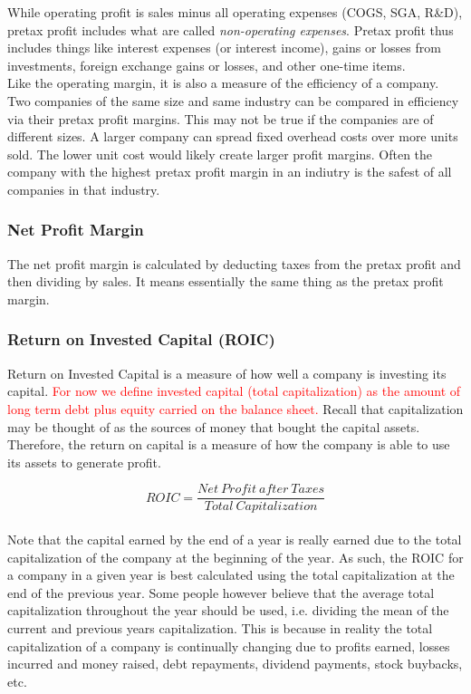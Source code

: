 \documentclass{article}
\begin{document}
While operating profit is sales minus all operating expenses (COGS, SGA, R\&D), pretax profit includes what are called \textit{non-operating expenses}. Pretax profit thus includes things like interest expenses (or interest income), gains or losses from investments, foreign exchange gains or losses, and other one-time items. \\

Like the operating margin, it is also a measure of the efficiency of a company. Two companies of the same size and same industry can be compared in efficiency via their pretax profit margins. This may not be true if the companies are of different sizes. A larger company can spread fixed overhead costs over more units sold. The lower unit cost would likely create larger profit margins. Often the company with the highest pretax profit margin in an indiutry is the safest of all companies in that industry. 

\subsubsection{Net Profit Margin}
The net profit margin is calculated by deducting taxes from the pretax profit and then dividing by sales. It means essentially the same thing as the pretax profit margin. 

\subsubsection{Return on Invested Capital (ROIC)}
Return on Invested Capital is a measure of how well a company is investing its capital. \textcolor{red}{For now we define invested capital (total capitalization) as the amount of long term debt plus equity carried on the balance sheet.} Recall that capitalization may be thought of as the sources of money that bought the capital assets. Therefore, the return on capital is a measure of how the company is able to use its assets to generate profit. 

 \begin{equation}
    ROIC = \frac{Net\: Profit\: after\: Taxes}{Total\: Capitalization}
\end{equation}\\

Note that the capital earned by the end of a year is really earned due to the total capitalization of the company at the beginning of the year. As such, the ROIC for a company in a given year is best calculated using the total capitalization at the end of the previous year. Some people however believe that the average total capitalization throughout the year should be used, i.e. dividing the mean of the current and previous years capitalization. This is because in reality the total capitalization of a company is continually changing due to profits earned, losses incurred and money raised, debt repayments, dividend payments, stock buybacks, etc. 
\end{document}
